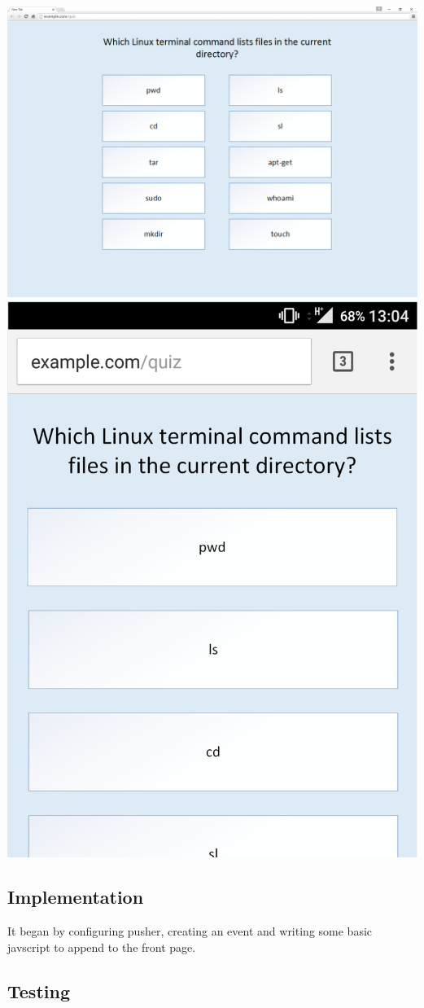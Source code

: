 \documentclass{article}
\begin{document}
\begin{center}
	\includegraphics[width=\textwidth]{Quiz-Web-Design-Cropped}\\
	\vspace{1cm}
	\includegraphics[scale=0.25]{Quiz-Mobile-Cropped}
\end{center}


\subsection{Implementation}
It began by configuring pusher, creating an event and writing some basic javscript to append to the front page.
\subsection{Testing}
\newpage

%
%
\end{document}
